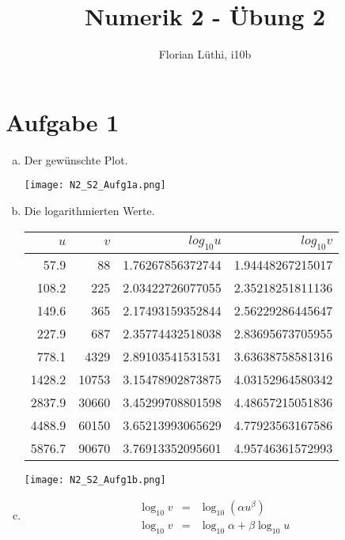 \documentclass[11pt]{article} %
\title{Numerik 2 - Übung 2}
\author{Florian Lüthi, i10b}
\begin{document}
\maketitle

\section*{Aufgabe 1}

\begin{enumerate}[a)]

\item %
Der gewünschte Plot.

\texttt{[image: N2\_S2\_Aufg1a.png]}

\item %
Die logarithmierten Werte.

\begin{tabular}{r|r|r|r}
$u$ & $v$ & $log_{10}u$ & $log_{10}v$ \\
\hline
57.9 &	88 &		1.76267856372744 &	1.94448267215017 \\
108.2 &	225 &	2.03422726077055 &	2.35218251811136 \\
149.6 &	365 &	2.17493159352844 &	2.56229286445647 \\
227.9 &	687 &	2.35774432518038 &	2.83695673705955 \\
778.1 &	4329 &	2.89103541531531 &	3.63638758581316 \\
1428.2 &	10753 &	3.15478902873875 &	4.03152964580342 \\
2837.9 &	30660 &	3.45299708801598 &	4.48657215051836 \\
4488.9 &	60150 &	3.65213993065629 &	4.77923563167586 \\
5876.7 &	90670 &	3.76913352095601 &	4.95746361572993 \\

\end{tabular}

\texttt{[image: N2\_S2\_Aufg1b.png]}

\item %

\begin{eqnarray*}
\log_{10}{v} &=& \log_{10}(\alpha u^\beta) \\
\log_{10}{v} &=& \log_{10}\alpha + \beta \log_{10}u
\end{eqnarray*}


\end{enumerate}
\end{document}
